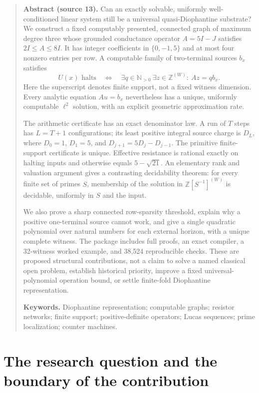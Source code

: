 \documentclass[11pt,letterpaper]{article}
\theoremstyle{definition}
\theoremstyle{remark}
\newcommand{\N}{\mathbb N}
\newcommand{\Z}{\mathbb Z}
\begin{document}
\begin{quote}\small
\textbf{Abstract (source 13).} Can an exactly solvable, uniformly well-conditioned linear system still be a
universal quasi-Diophantine substrate? We construct a fixed computably presented,
connected graph of maximum degree three whose grounded conductance operator
$A=5I-J$ satisfies $2I\leq A\leq8I$. It has integer coefficients in
$\{0,-1,5\}$ and at most four nonzero entries per row. A computable family of
two-terminal sources $b_x$ satisfies
\[
 U(x)\text{ halts}\quad\Longleftrightarrow\quad
 \exists q\in\N_{>0}\ \exists z\in\Z^{(W)}:\ Az=qb_x.
\]
Here the superscript denotes finite support, not a fixed witness dimension.
Every analytic equation $Au=b_x$ nevertheless has a unique, uniformly
computable $\ell^2$ solution, with an explicit geometric approximation rate.

The arithmetic certificate has an exact denominator law. A run of $T$ steps
has $L=T+1$ configurations; its least positive integral source charge is
$D_L$, where $D_0=1$, $D_1=5$, and $D_{j+1}=5D_j-D_{j-1}$. The primitive
finite-support certificate is unique. Effective resistance is rational exactly
on halting inputs and otherwise equals $5-\sqrt{21}$. An elementary rank and
valuation argument gives a contrasting decidability theorem: for every finite
set of primes $S$, membership of the solution in
$\Z[S^{-1}]^{(W)}$ is decidable, uniformly in $S$ and the input.

We also prove a sharp connected row-sparsity threshold, explain why a positive
one-terminal source cannot work, and give a single quadratic polynomial over
natural numbers for each external horizon, with a unique complete witness.
The package includes full proofs, an exact compiler, a 32-witness worked
example, and 38,524 reproducible checks. These are proposed structural
contributions, not a claim to solve a named classical open problem, establish
historical priority, improve a fixed universal-polynomial operation bound, or
settle finite-fold Diophantine representation.

\textbf{Keywords.} Diophantine representation; computable graphs;
resistor networks; finite support; positive-definite operators; Lucas sequences;
prime localization; counter machines.
\end{quote}

\section{The research question and the boundary of the contribution}
\label{ste:wc:sec:scope}
\end{document}

